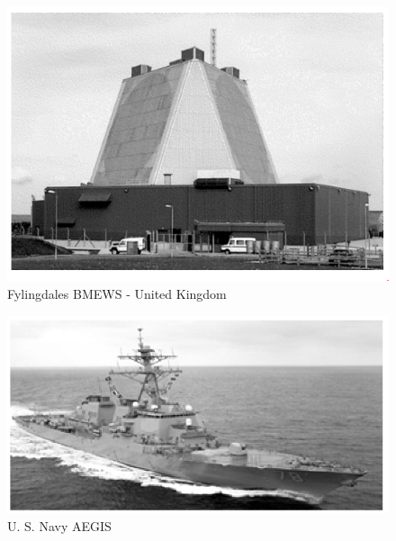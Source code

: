 \documentclass[14pt]{article} %
\begin{document}
 \begin{figure}[H]
  \includegraphics[width=\linewidth]{fylingdales.png}
  \caption{Fylingdales BMEWS - United Kingdom}
  \label{fig:figure 5}
\end{figure}


\begin{figure}[H]
  \includegraphics[width=\linewidth]{Navy.png}
  \caption{U. S. Navy AEGIS}
  \label{fig:figure 6}
\end{figure}
\end{document}
